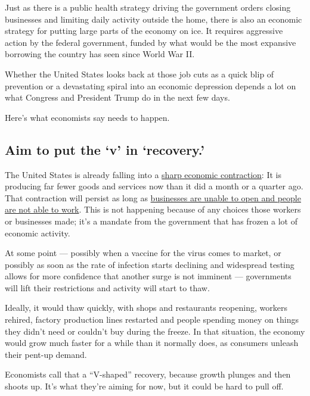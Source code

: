Just as there is a public health strategy driving the government orders
closing businesses and limiting daily activity outside the home, there
is also an economic strategy for putting large parts of the economy on
ice. It requires aggressive action by the federal government, funded by
what would be the most expansive borrowing the country has seen since
World War II.

Whether the United States looks back at those job cuts as a quick blip
of prevention or a devastating spiral into an economic depression
depends a lot on what Congress and President Trump do in the next few
days.

Here's what economists say needs to happen.

\hypertarget{aim-to-put-the-v-in-recovery}{%
\subsection{Aim to put the `v' in
`recovery.'}\label{aim-to-put-the-v-in-recovery}}

The United States is already falling into a
\href{https://www.nytimes3xbfgragh.onion/2020/03/21/business/economy/coronavirus-recession.html}{sharp
economic contraction}: It is producing far fewer goods and services now
than it did a month or a quarter ago. That contraction will persist as
long as
\href{https://www.nytimes3xbfgragh.onion/2020/03/15/business/economy/coronavirus-economy-impact.html}{businesses
are unable to open and people are not able to work}. This is not
happening because of any choices those workers or businesses made; it's
a mandate from the government that has frozen a lot of economic
activity.

At some point --- possibly when a vaccine for the virus comes to market,
or possibly as soon as the rate of infection starts declining and
widespread testing allows for more confidence that another surge is not
imminent --- governments will lift their restrictions and activity will
start to thaw.

Ideally, it would thaw quickly, with shops and restaurants reopening,
workers rehired, factory production lines restarted and people spending
money on things they didn't need or couldn't buy during the freeze. In
that situation, the economy would grow much faster for a while than it
normally does, as consumers unleash their pent-up demand.

Economists call that a ``V-shaped'' recovery, because growth plunges and
then shoots up. It's what they're aiming for now, but it could be hard
to pull off.

